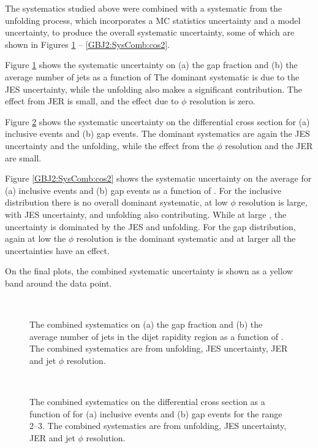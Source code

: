 The systematics studied above were combined  with a systematic from the unfolding process, which incorporates a MC statistics uncertainty and a model uncertainty, to produce the overall systematic uncertainty, some of which are shown in Figures \ref{GBJ2:SysComb:GapNjet} -- \ref{GBJ2:SysComb:cos2}.

Figure \ref{GBJ2:SysComb:GapNjet} shows the systematic uncertainty on (a) the gap fraction and (b) the average number of jets as a function of \dy{}
The dominant systematic is due to the JES uncertainty, while the unfolding also makes a significant contribution. 
The effect from JER is small, and the effect due to $\phi$ resolution is zero.


Figure \ref{GBJ2:SysComb:dphi23} shows the systematic uncertainty on the differential cross section for (a) inclusive events and (b) gap events.
The dominant systematics are again the JES uncertainty and the unfolding, while the effect from the $\phi$ resolution and the JER are small.

Figure \ref{GBJ2:SysComb:cos2} shows the systematic uncertainty on the average \costwodphi{} for (a) inclusive events and (b) gap events as a function of \dy{}.
For the inclusive distribution there is no overall dominant systematic, at low \dy{} $\phi$ resolution is large, with JES uncertainty, and unfolding also contributing.
While at large \dy{}, the uncertainty is dominated by the JES and unfolding.
For the gap distribution, again at low \dy{} the $\phi$ resolution is the dominant systematic and at larger \dy{} all the uncertainties have an effect. 

On the final plots, the combined systematic uncertainty is shown as a yellow band around the data point.


\begin{figure}
\centering
\mbox{
              \quad
              \quad
                              }
\caption[]{
The combined systematics on (a) the gap fraction and (b) the average number of jets in the dijet rapidity region as a function of \dy{}.
The combined systematics are from unfolding, JES uncertainty, JER and jet $\phi$ resolution.
\label{GBJ2:SysComb:GapNjet}}
\end{figure}
\begin{figure}
\centering
\mbox{
              \quad
              \quad
                              }
\caption[]{
The combined systematics on the differential cross section as a function of \dphi{}  for (a) inclusive events and (b) gap events for the \dy{} range 2--3.
The combined systematics are from unfolding, JES uncertainty, JER and jet $\phi$ resolution.
\label{GBJ2:SysComb:dphi23}}
\end{figure}


